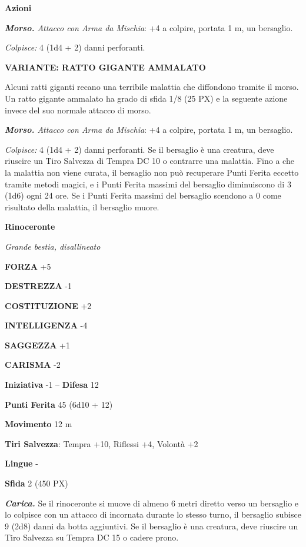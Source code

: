 \begin{multicols}{2}
\textbf{Azioni}

\textit{\textbf{Morso.} Attacco con Arma da Mischia}: +4 a colpire, portata 1 m, un bersaglio.

\textit{Colpisce:} 4 (1d4 + 2) danni perforanti.

\textbf{VARIANTE: RATTO GIGANTE AMMALATO}

Alcuni ratti giganti recano una terribile malattia che diffondono tramite il morso. Un ratto gigante ammalato ha grado di sfida 1/8 (25 PX) e la seguente azione invece del suo normale attacco di morso.

\textit{\textbf{Morso.} Attacco con Arma da Mischia}: +4 a colpire, portata 1 m, un bersaglio.

\textit{Colpisce:} 4 (1d4 + 2) danni perforanti. Se il bersaglio è una creatura, deve riuscire un Tiro Salvezza di Tempra DC 10 o contrarre una malattia. Fino a che la malattia non viene curata, il bersaglio non può recuperare Punti Ferita eccetto tramite metodi magici, e i Punti Ferita massimi del bersaglio diminuiscono di 3 (1d6) ogni 24 ore. Se i Punti Ferita massimi del bersaglio scendono a 0 come risultato della malattia, il bersaglio muore.

\medskip\textbf{Rinoceronte}

\textit{Grande bestia, disallineato}

\textbf{FORZA} +5

\textbf{DESTREZZA} -1

\textbf{COSTITUZIONE} +2

\textbf{INTELLIGENZA} -4

\textbf{SAGGEZZA} +1

\textbf{CARISMA} -2

\textbf{Iniziativa} -1 -- \textbf{Difesa} 12

\textbf{Punti Ferita} 45 (6d10 + 12)

\textbf{Movimento} 12 m

\textbf{Tiri Salvezza}: Tempra +10, Riflessi +4, Volontà +2

\textbf{Lingue} -

\textbf{Sfida} 2 (450 PX)

\textit{\textbf{Carica.}} Se il rinoceronte si muove di almeno 6 metri diretto verso un bersaglio e lo colpisce con un attacco di incornata durante lo stesso turno, il bersaglio subisce 9 (2d8) danni da botta aggiuntivi. Se il bersaglio è una creatura, deve riuscire un Tiro Salvezza su Tempra DC 15 o cadere prono.


\end{multicols}
